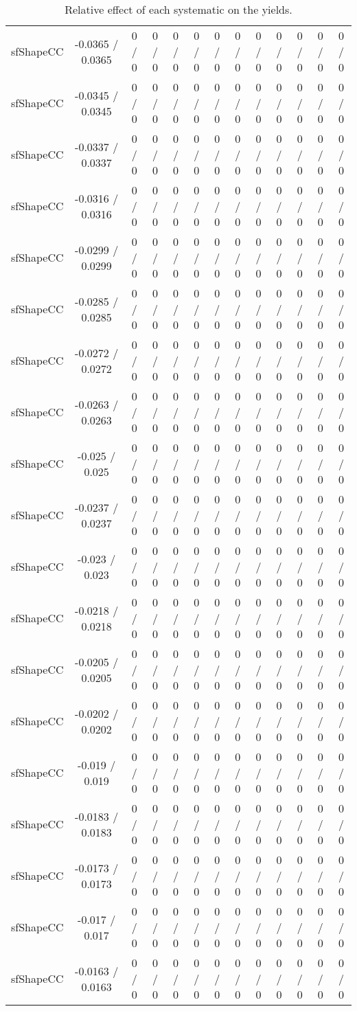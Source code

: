 \documentclass[10pt]{article}
\begin{document}
\begin{table}[htbp]
\begin{center}
\begin{tabular}{|c|c|c|c|c|c|c|c|c|c|c|c|c|}
  sfShapeCC & -0.0365 / 0.0365 & 0 / 0 & 0 / 0 & 0 / 0 & 0 / 0 & 0 / 0 & 0 / 0 & 0 / 0 & 0 / 0 & 0 / 0 & 0 / 0 & 0 / 0 \\ 
  sfShapeCC & -0.0345 / 0.0345 & 0 / 0 & 0 / 0 & 0 / 0 & 0 / 0 & 0 / 0 & 0 / 0 & 0 / 0 & 0 / 0 & 0 / 0 & 0 / 0 & 0 / 0 \\ 
  sfShapeCC & -0.0337 / 0.0337 & 0 / 0 & 0 / 0 & 0 / 0 & 0 / 0 & 0 / 0 & 0 / 0 & 0 / 0 & 0 / 0 & 0 / 0 & 0 / 0 & 0 / 0 \\ 
  sfShapeCC & -0.0316 / 0.0316 & 0 / 0 & 0 / 0 & 0 / 0 & 0 / 0 & 0 / 0 & 0 / 0 & 0 / 0 & 0 / 0 & 0 / 0 & 0 / 0 & 0 / 0 \\ 
  sfShapeCC & -0.0299 / 0.0299 & 0 / 0 & 0 / 0 & 0 / 0 & 0 / 0 & 0 / 0 & 0 / 0 & 0 / 0 & 0 / 0 & 0 / 0 & 0 / 0 & 0 / 0 \\ 
  sfShapeCC & -0.0285 / 0.0285 & 0 / 0 & 0 / 0 & 0 / 0 & 0 / 0 & 0 / 0 & 0 / 0 & 0 / 0 & 0 / 0 & 0 / 0 & 0 / 0 & 0 / 0 \\ 
  sfShapeCC & -0.0272 / 0.0272 & 0 / 0 & 0 / 0 & 0 / 0 & 0 / 0 & 0 / 0 & 0 / 0 & 0 / 0 & 0 / 0 & 0 / 0 & 0 / 0 & 0 / 0 \\ 
  sfShapeCC & -0.0263 / 0.0263 & 0 / 0 & 0 / 0 & 0 / 0 & 0 / 0 & 0 / 0 & 0 / 0 & 0 / 0 & 0 / 0 & 0 / 0 & 0 / 0 & 0 / 0 \\ 
  sfShapeCC & -0.025 / 0.025 & 0 / 0 & 0 / 0 & 0 / 0 & 0 / 0 & 0 / 0 & 0 / 0 & 0 / 0 & 0 / 0 & 0 / 0 & 0 / 0 & 0 / 0 \\ 
  sfShapeCC & -0.0237 / 0.0237 & 0 / 0 & 0 / 0 & 0 / 0 & 0 / 0 & 0 / 0 & 0 / 0 & 0 / 0 & 0 / 0 & 0 / 0 & 0 / 0 & 0 / 0 \\ 
  sfShapeCC & -0.023 / 0.023 & 0 / 0 & 0 / 0 & 0 / 0 & 0 / 0 & 0 / 0 & 0 / 0 & 0 / 0 & 0 / 0 & 0 / 0 & 0 / 0 & 0 / 0 \\ 
  sfShapeCC & -0.0218 / 0.0218 & 0 / 0 & 0 / 0 & 0 / 0 & 0 / 0 & 0 / 0 & 0 / 0 & 0 / 0 & 0 / 0 & 0 / 0 & 0 / 0 & 0 / 0 \\ 
  sfShapeCC & -0.0205 / 0.0205 & 0 / 0 & 0 / 0 & 0 / 0 & 0 / 0 & 0 / 0 & 0 / 0 & 0 / 0 & 0 / 0 & 0 / 0 & 0 / 0 & 0 / 0 \\ 
  sfShapeCC & -0.0202 / 0.0202 & 0 / 0 & 0 / 0 & 0 / 0 & 0 / 0 & 0 / 0 & 0 / 0 & 0 / 0 & 0 / 0 & 0 / 0 & 0 / 0 & 0 / 0 \\ 
  sfShapeCC & -0.019 / 0.019 & 0 / 0 & 0 / 0 & 0 / 0 & 0 / 0 & 0 / 0 & 0 / 0 & 0 / 0 & 0 / 0 & 0 / 0 & 0 / 0 & 0 / 0 \\ 
  sfShapeCC & -0.0183 / 0.0183 & 0 / 0 & 0 / 0 & 0 / 0 & 0 / 0 & 0 / 0 & 0 / 0 & 0 / 0 & 0 / 0 & 0 / 0 & 0 / 0 & 0 / 0 \\ 
  sfShapeCC & -0.0173 / 0.0173 & 0 / 0 & 0 / 0 & 0 / 0 & 0 / 0 & 0 / 0 & 0 / 0 & 0 / 0 & 0 / 0 & 0 / 0 & 0 / 0 & 0 / 0 \\ 
  sfShapeCC & -0.017 / 0.017 & 0 / 0 & 0 / 0 & 0 / 0 & 0 / 0 & 0 / 0 & 0 / 0 & 0 / 0 & 0 / 0 & 0 / 0 & 0 / 0 & 0 / 0 \\ 
  sfShapeCC & -0.0163 / 0.0163 & 0 / 0 & 0 / 0 & 0 / 0 & 0 / 0 & 0 / 0 & 0 / 0 & 0 / 0 & 0 / 0 & 0 / 0 & 0 / 0 & 0 / 0 \\ 
\hline 
\end{tabular} 
\caption{Relative effect of each systematic on the yields.} 
\end{center} 
\end{table} 
\end{document}
